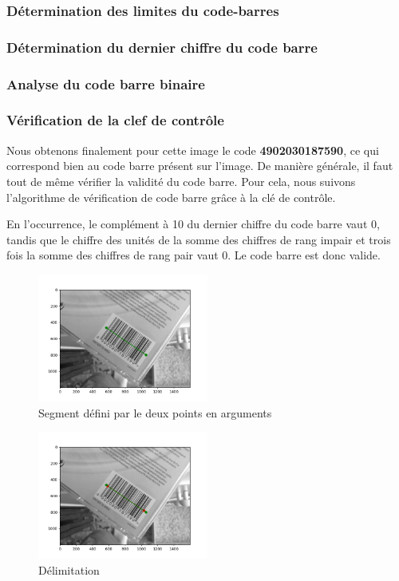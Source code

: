 \documentclass{rapport}
\begin{document}
\subsubsection*{Détermination des limites du code-barres}
\subsubsection*{Détermination du dernier chiffre du code barre}
\subsubsection*{Analyse du code barre binaire}
\subsubsection*{Vérification de la clef de contrôle}
Nous obtenons finalement pour cette image le code \textbf{4902030187590}, ce qui correspond bien au code barre présent sur l'image.
De manière générale, il faut tout de même vérifier la validité du code barre. Pour cela, nous suivons l'algorithme de vérification de code barre grâce à la clé de contrôle.

En l'occurrence, le complément à 10 du dernier chiffre du code barre vaut 0, tandis que le chiffre des unités de la somme des chiffres de rang impair et trois fois la somme des chiffres de rang pair vaut 0. 
Le code barre est donc valide.

\begin{figure}[H] %
	\centering
	\includegraphics[width=0.5\textwidth]{images/code_barre_couple_vert.png}
	\caption{Segment défini par le deux points en arguments}
\end{figure}


\begin{figure}[H] 
	\centering
	\includegraphics[width=0.5\textwidth]{images/binarisation.png}
	\caption{Délimitation}
	\label{fig:binarisation}
\end{figure}
\end{document}
